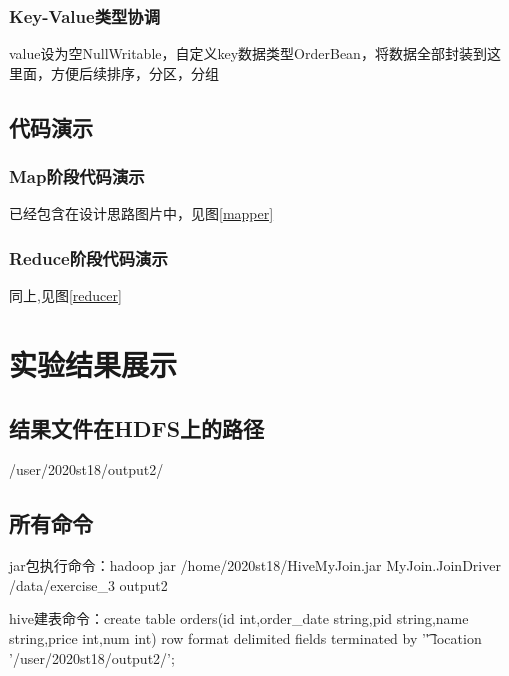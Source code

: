 \documentclass[a4paper,UTF8]{article}
\numberwithin{equation}{section}
\begin{document}
\subsubsection{Key-Value类型协调}
value设为空NullWritable，自定义key数据类型OrderBean，将数据全部封装到这里面，方便后续排序，分区，分组
\subsection{代码演示}
\subsubsection{Map阶段代码演示}
已经包含在设计思路图片中，见图\ref{mapper}

\subsubsection{Reduce阶段代码演示}
同上,见图\ref{reducer}
\section{实验结果展示}

\subsection{结果文件在HDFS上的路径}
/user/2020st18/output2/
\subsection{所有命令}
jar包执行命令：hadoop jar /home/2020st18/HiveMyJoin.jar MyJoin.JoinDriver /data/exercise\_3 output2 

hive建表命令：create table orders(id int,order\_date string,pid string,name string,price int,num int) row format delimited fields terminated by '\t' location '/user/2020st18/output2/';
\end{document}
